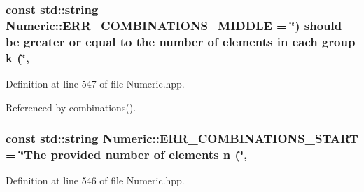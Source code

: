\hypertarget{classmultiscale_1_1Numeric_a0228a04871361c5e0dc8d90c53eed803}{
\subsubsection[{E\-R\-R\-\_\-\-C\-O\-M\-B\-I\-N\-A\-T\-I\-O\-N\-S\-\_\-\-M\-I\-D\-D\-L\-E}]{\setlength{\rightskip}{0pt plus 5cm}const std\-::string Numeric\-::\-E\-R\-R\-\_\-\-C\-O\-M\-B\-I\-N\-A\-T\-I\-O\-N\-S\-\_\-\-M\-I\-D\-D\-L\-E = \char`\"{}) should be greater or equal to the number of elements in each group k (\char`\"{}\hspace{0.3cm}{\ttfamily [static]}, {\ttfamily [private]}}}\label{classmultiscale_1_1Numeric_a0228a04871361c5e0dc8d90c53eed803}


Definition at line 547 of file Numeric.\-hpp.



Referenced by combinations().

\hypertarget{classmultiscale_1_1Numeric_a0de8a663c81ef3b50fba84645eab6e7d}{
\subsubsection[{E\-R\-R\-\_\-\-C\-O\-M\-B\-I\-N\-A\-T\-I\-O\-N\-S\-\_\-\-S\-T\-A\-R\-T}]{\setlength{\rightskip}{0pt plus 5cm}const std\-::string Numeric\-::\-E\-R\-R\-\_\-\-C\-O\-M\-B\-I\-N\-A\-T\-I\-O\-N\-S\-\_\-\-S\-T\-A\-R\-T = \char`\"{}The provided number of elements n (\char`\"{}\hspace{0.3cm}{\ttfamily [static]}, {\ttfamily [private]}}}\label{classmultiscale_1_1Numeric_a0de8a663c81ef3b50fba84645eab6e7d}


Definition at line 546 of file Numeric.\-hpp.



